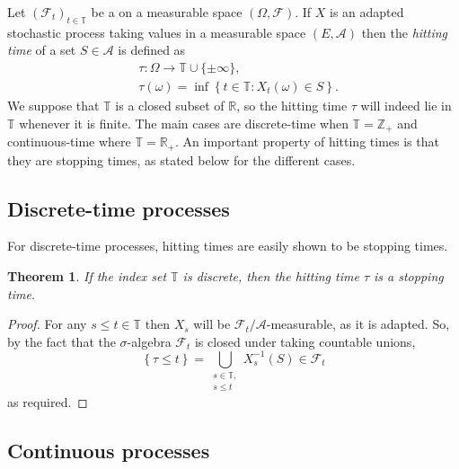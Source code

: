 \documentclass[12pt]{article}
\newtheorem*{theorem*}{Theorem}
\begin{document}

Let $(\mathcal{F}_t)_{t\in\mathbb{T}}$ be a  on a measurable space $(\Omega,\mathcal{F})$. If $X$ is an adapted stochastic process taking values in a measurable space $(E,\mathcal{A})$ then the \emph{hitting time} of a set $S\in\mathcal{A}$ is defined as
\begin{align*}
&\tau\colon\Omega\rightarrow\mathbb{T}\cup\{\pm\infty\},\\
&\tau(\omega)=\inf\left\{t\in\mathbb{T}:X_t(\omega)\in S\right\}.
\end{align*}
We suppose that $\mathbb{T}$ is a closed subset of $\mathbb{R}$, so the hitting time $\tau$ will indeed lie in $\mathbb{T}$ whenever it is finite. The main cases are discrete-time when $\mathbb{T}=\mathbb{Z}_+$ and continuous-time where $\mathbb{T}=\mathbb{R}_+$. An important property of hitting times is that they are stopping times, as stated below for the different cases.

\subsection*{Discrete-time processes}

For discrete-time processes, hitting times are easily shown to be stopping times.

\begin{theorem*}
If the index set $\mathbb{T}$ is discrete, then the hitting time $\tau$ is a stopping time.
\end{theorem*}
\begin{proof}
For any $s\le t\in\mathbb{T}$ then $X_s$ will be $\mathcal{F}_t/\mathcal{A}$-measurable, as it is adapted. So, by the fact that the $\sigma$-algebra $\mathcal{F}_t$ is closed under taking countable unions,
\begin{equation*}
\left\{\tau\le t\right\}=\bigcup_{\substack{s\in\mathbb{T},\\ s\le t}}X_s^{-1}(S)\in\mathcal{F}_t
\end{equation*}
as required.
\end{proof}

\subsection*{Continuous processes}
\end{document}

